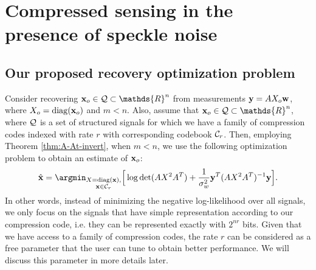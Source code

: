 \documentclass[onecolumn]{IEEEtran}
\newcommand{\wv}{{\bf w}}
\begin{document}




%

 \section{Compressed sensing in the presence of speckle noise}\label{sec:compress}

\subsection{Our proposed recovery optimization problem} \label{ssec:recovery_opt}
Consider recovering $\xv_o\in\Qc\subset\mathds{R}^n$ from measurements $\yv=AX_o\wv$, where  $X_o=\mathop{\rm diag}\nolimits({\bf x}_o)$ and $m<n$. Also, assume that $\xv_o\in\Qc\subset\mathds{R}^n$, where $\mathcal{Q}$ is a set of structured signals for which we have a family of compression codes indexed with rate $r$ with corresponding codebook $\mathcal{C}_r$. Then, employing Theorem \ref{thm:A-At-invert}, when $m<n$, we use  the following  optimization problem to obtain an estimate of ${\bf x}_o$:
\begin{align}
\hat{\xv}=\argmin_{\substack{X=\diag(\xv), \\ \xv\in\Cc_r}}\Big[ \log\det(AX^2A^T)+{1\over \sigma_w^2}\yv^T(AX^2A^T)^{-1}\yv\Big].\label{eq:main-opt-ML}
\end{align}
In other words, instead of minimizing the negative log-likelihood over all signals, we only focus on the signals that have simple representation according to our compression code, i.e. they can be represented exactly with $2^{nr}$ bits. Given that we have access to a family of compression codes, the rate $r$ can be considered as a free parameter that the user can tune to obtain better performance. We will discuss this parameter in more details later.  
\end{document}
